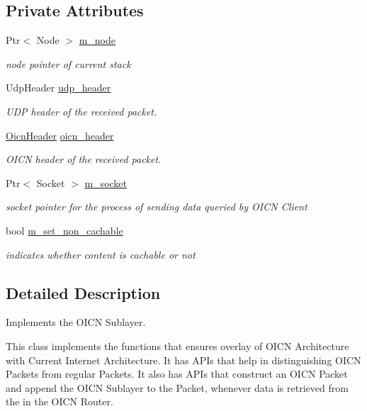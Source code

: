 \subsection*{Private Attributes}
\begin{DoxyCompactItemize}
\item 
Ptr$<$ Node $>$ \hyperlink{classns3_1_1SublayerProtocol_a4993887dad842a577bdfdfa10cecb7d7}{m\-\_\-node}
\begin{DoxyCompactList}\small\item\em node pointer of current stack \end{DoxyCompactList}\item 
Udp\-Header \hyperlink{classns3_1_1SublayerProtocol_a95b083926386de937c4e9b0a235a4ab8}{udp\-\_\-header}
\begin{DoxyCompactList}\small\item\em U\-D\-P header of the received packet. \end{DoxyCompactList}\item 
\hyperlink{classns3_1_1OicnHeader}{Oicn\-Header} \hyperlink{classns3_1_1SublayerProtocol_a9ceec600a64150a12295c82f01bb8e3c}{oicn\-\_\-header}
\begin{DoxyCompactList}\small\item\em O\-I\-C\-N header of the received packet. \end{DoxyCompactList}\item 
Ptr$<$ Socket $>$ \hyperlink{classns3_1_1SublayerProtocol_a6fb3c36f156ba315448ef4fe95a3c4f6}{m\-\_\-socket}
\begin{DoxyCompactList}\small\item\em socket pointer for the process of sending data queried by O\-I\-C\-N Client \end{DoxyCompactList}\item 
bool \hyperlink{classns3_1_1SublayerProtocol_a829d9ef293fd6c38367143c338850cb7}{m\-\_\-set\-\_\-non\-\_\-cachable}
\begin{DoxyCompactList}\small\item\em indicates whether content is cachable or not \end{DoxyCompactList}\end{DoxyCompactItemize}


\subsection{Detailed Description}
Implements the O\-I\-C\-N Sublayer. 

This class implements the functions that ensures overlay of O\-I\-C\-N Architecture with Current Internet Architecture. It has A\-P\-Is that help in distinguishing O\-I\-C\-N Packets from regular Packets. It also has A\-P\-Is that construct an O\-I\-C\-N Packet and append the O\-I\-C\-N Sublayer to the Packet, whenever data is retrieved from the in the O\-I\-C\-N Router.

